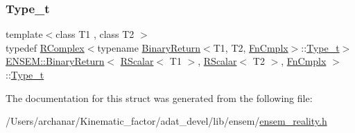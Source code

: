 \subsubsection{\texorpdfstring{Type\_t}{Type\_t}\hspace{0.1cm}{\footnotesize\ttfamily [2/2]}}
{\footnotesize\ttfamily template$<$class T1 , class T2 $>$ \\
typedef \mbox{\hyperlink{classENSEM_1_1RComplex}{R\+Complex}}$<$typename \mbox{\hyperlink{structENSEM_1_1BinaryReturn}{Binary\+Return}}$<$T1, T2, \mbox{\hyperlink{structENSEM_1_1FnCmplx}{Fn\+Cmplx}}$>$\+::\mbox{\hyperlink{structENSEM_1_1BinaryReturn_3_01RScalar_3_01T1_01_4_00_01RScalar_3_01T2_01_4_00_01FnCmplx_01_4_a478f881e6acca67db287ec50e606ace1}{Type\+\_\+t}}$>$ \mbox{\hyperlink{structENSEM_1_1BinaryReturn}{E\+N\+S\+E\+M\+::\+Binary\+Return}}$<$ \mbox{\hyperlink{classENSEM_1_1RScalar}{R\+Scalar}}$<$ T1 $>$, \mbox{\hyperlink{classENSEM_1_1RScalar}{R\+Scalar}}$<$ T2 $>$, \mbox{\hyperlink{structENSEM_1_1FnCmplx}{Fn\+Cmplx}} $>$\+::\mbox{\hyperlink{structENSEM_1_1BinaryReturn_3_01RScalar_3_01T1_01_4_00_01RScalar_3_01T2_01_4_00_01FnCmplx_01_4_a478f881e6acca67db287ec50e606ace1}{Type\+\_\+t}}}



The documentation for this struct was generated from the following file\+:\begin{DoxyCompactItemize}
\item 
/\+Users/archanar/\+Kinematic\+\_\+factor/adat\+\_\+devel/lib/ensem/\mbox{\hyperlink{lib_2ensem_2ensem__reality_8h}{ensem\+\_\+reality.\+h}}\end{DoxyCompactItemize}
